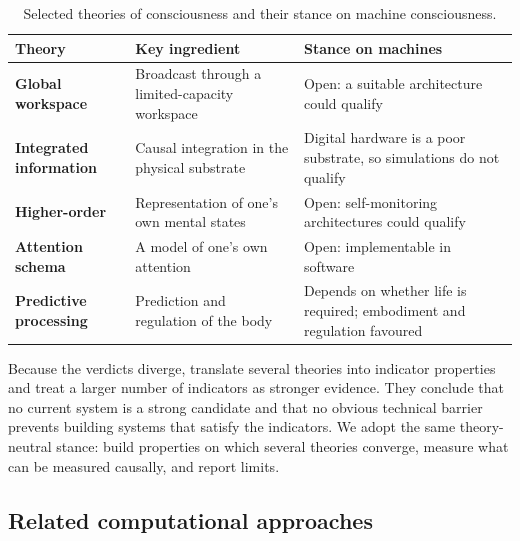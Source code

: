 \documentclass[twoside,11pt]{article}
\begin{document}
\begin{table}[!htbp]
\centering
\caption{Selected theories of consciousness and their stance on machine consciousness.}\label{tab:2}
\small
\renewcommand{\arraystretch}{1.2}
\begin{tabular}{>{\raggedright\arraybackslash}p{\dimexpr 0.2216\dimexpr\textwidth-6\tabcolsep\relax\relax}>{\raggedright\arraybackslash}p{\dimexpr 0.3324\dimexpr\textwidth-6\tabcolsep\relax\relax}>{\raggedright\arraybackslash}p{\dimexpr 0.4460\dimexpr\textwidth-6\tabcolsep\relax\relax}}
\toprule
\textbf{Theory} & \textbf{Key ingredient} & \textbf{Stance on machines} \\
\midrule
\textbf{Global workspace} & Broadcast through a limited-capacity workspace & Open: a suitable architecture could qualify \\
\textbf{Integrated information} & Causal integration in the physical substrate & Digital hardware is a poor substrate, so simulations do not qualify \\
\textbf{Higher-order} & Representation of one's own mental states & Open: self-monitoring architectures could qualify \\
\textbf{Attention schema} & A model of one's own attention & Open: implementable in software \\
\textbf{Predictive processing} & Prediction and regulation of the body & Depends on whether life is required; embodiment and regulation favoured \\
\bottomrule
\end{tabular}
\par{}
\end{table}

Because the verdicts diverge, \citet{butlin2023} translate several theories into indicator properties and treat a larger number of indicators as stronger evidence. They conclude that no current system is a strong candidate and that no obvious technical barrier prevents building systems that satisfy the indicators. We adopt the same theory-neutral stance: build properties on which several theories converge, measure what can be measured causally, and report limits.

\subsection{Related computational approaches}\label{sec:2.3}
\end{document}
